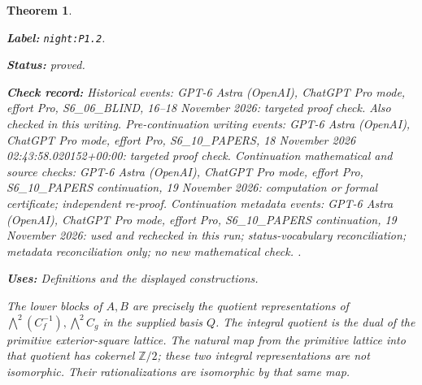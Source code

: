 \documentclass[11pt,a4paper]{article}
\newtheorem{theorem}{Theorem}[section]
\theoremstyle{definition}
\newcommand{\StatementRecord}[4]{\par\smallskip\begingroup\upshape\raggedright\noindent\textbf{Label:} \nolinkurl{#1}.\par\noindent\textbf{Status:} #2.\par\noindent\textbf{Check record:} #3.\par\noindent\textbf{Uses:} #4.\par\endgroup\smallskip}
\begin{document}
\begin{theorem}\label{night:P1.2}
\StatementRecord{night:P1.2}{proved}{Historical events: GPT-6 Astra (OpenAI), ChatGPT Pro mode, effort Pro, S6\_06\_BLIND, 16--18 November 2026: targeted proof check. Also checked in this writing. Pre-continuation writing events: GPT-6 Astra (OpenAI), ChatGPT Pro mode, effort Pro, S6\_10\_PAPERS, 18 November 2026 02:43:58.020152+00:00: targeted proof check. Continuation mathematical and source checks: GPT-6 Astra (OpenAI), ChatGPT Pro mode, effort Pro, S6\_10\_PAPERS continuation, 19 November 2026: computation or formal certificate; independent re-proof. Continuation metadata events: GPT-6 Astra (OpenAI), ChatGPT Pro mode, effort Pro, S6\_10\_PAPERS continuation, 19 November 2026: used and rechecked in this run; status-vocabulary reconciliation; metadata reconciliation only; no new mathematical check. }{Definitions and the displayed constructions}
The lower blocks of $A,B$ are precisely the quotient representations of
$\bigwedge^2(C_f^{-1}),\bigwedge^2C_g$ in the supplied basis $Q$.
The integral quotient is the dual of the primitive exterior-square
lattice.  The natural map from the primitive lattice into that quotient
has cokernel $\mathbb Z/2$; these two integral representations are not
isomorphic.  Their rationalizations are isomorphic by that same map.
\end{theorem}
\end{document}
